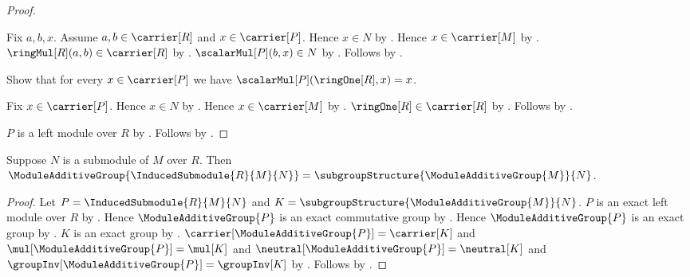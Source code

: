\begin{proof}
\begin{subproof}
        Fix $a,b,x$.
        Assume $a,b\in\carrier[R]$ and $x\in\carrier[P]$.
        Hence $x\in N$ by .
        Hence $x\in\carrier[M]$ by .
        $\ringMul[R](a,b)\in\carrier[R]$ by .
        $\scalarMul[P](b,x)\in N$ by
            .
        Follows by
            .
    \end{subproof}
    Show that for every $x\in\carrier[P]$ we have
        $\scalarMul[P](\ringOne[R],x)=x$.
    \begin{subproof}
        Fix $x\in\carrier[P]$.
        Hence $x\in N$ by .
        Hence $x\in\carrier[M]$ by .
        $\ringOne[R]\in\carrier[R]$ by .
        Follows by
            .
    \end{subproof}
    $P$ is a left module over $R$ by
        .
    Follows by
        .
\end{proof}

\begin{theorem}\label{induced_submodule_additive_group}
    Suppose $N$ is a submodule of $M$ over $R$.
    Then
        $\ModuleAdditiveGroup{\InducedSubmodule{R}{M}{N}}
            =\subgroupStructure{\ModuleAdditiveGroup{M}}{N}$.
\end{theorem}
\begin{proof}
    Let $P=\InducedSubmodule{R}{M}{N}$ and
        $K=\subgroupStructure{\ModuleAdditiveGroup{M}}{N}$.
    $P$ is an exact left module over $R$ by
        .
    Hence $\ModuleAdditiveGroup{P}$ is an exact commutative group by
        .
    Hence $\ModuleAdditiveGroup{P}$ is an exact group by
        .
    $K$ is an exact group by
        .
    $\carrier[\ModuleAdditiveGroup{P}]=\carrier[K]$ and
        $\mul[\ModuleAdditiveGroup{P}]=\mul[K]$ and
        $\neutral[\ModuleAdditiveGroup{P}]=\neutral[K]$ and
        $\groupInv[\ModuleAdditiveGroup{P}]=\groupInv[K]$ by
        .
    Follows by .
\end{proof}

